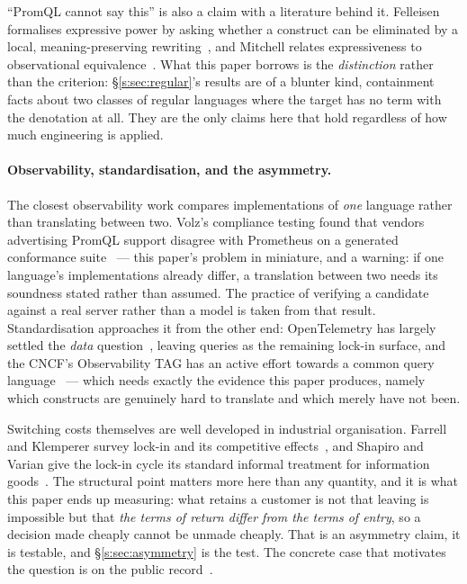 ``PromQL cannot say this'' is also a claim with a literature behind it. Felleisen
formalises expressive power by asking whether a construct can be eliminated by a local,
meaning-preserving rewriting~\citep{felleisen1991}, and Mitchell relates expressiveness to
observational equivalence~\citep{mitchell1993}. What this paper borrows is the
\emph{distinction} rather than the criterion: \S\ref{s:sec:regular}'s results are of a
blunter kind, containment facts about two classes of regular languages where the target has
no term with the denotation at all. They are the only claims here that hold regardless of
how much engineering is applied.

\paragraph{Observability, standardisation, and the asymmetry.}
The closest observability work compares implementations of \emph{one} language rather than
translating between two. Volz's compliance testing found that vendors advertising PromQL
support disagree with Prometheus on a generated conformance suite~\citep{volz2020} --- this
paper's problem in miniature, and a warning: if one language's implementations already
differ, a translation between two needs its soundness stated rather than assumed. The
practice of verifying a candidate against a real server rather than a model is taken from
that result. Standardisation approaches it from the other end: OpenTelemetry has largely
settled the \emph{data} question~\citep{otel}, leaving queries as the remaining lock-in
surface, and the CNCF's Observability TAG has an active effort towards a common query
language~\citep{sharma2025} --- which needs exactly the evidence this paper produces, namely
which constructs are genuinely hard to translate and which merely have not been.

Switching costs themselves are well developed in industrial organisation. Farrell and
Klemperer survey lock-in and its competitive effects~\citep{farrell2007}, and Shapiro and
Varian give the lock-in cycle its standard informal treatment for information
goods~\citep{shapiro1999}. The structural point matters more here than any quantity, and it
is what this paper ends up measuring: what retains a customer is not that leaving is
impossible but that \emph{the terms of return differ from the terms of entry}, so a
decision made cheaply cannot be unmade cheaply. That is an asymmetry claim, it is testable,
and \S\ref{s:sec:asymmetry} is the test. The concrete case that motivates the question is
on the public record~\citep{orosz2023}.

